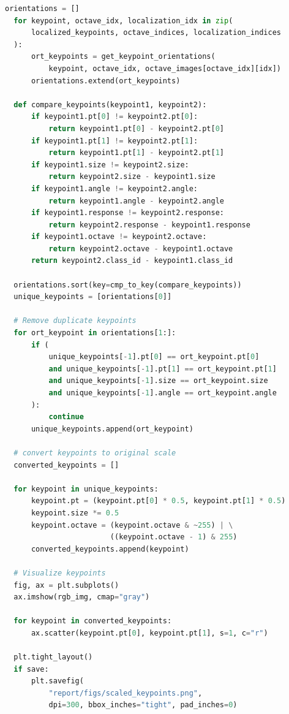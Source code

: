 \documentclass[11pt,a4paper]{article}
\begin{document}
\begin{lstlisting}[language=Python, caption=Orientation assignment]
  orientations = []
  for keypoint, octave_idx, localization_idx in zip(
      localized_keypoints, octave_indices, localization_indices
  ):
      ort_keypoints = get_keypoint_orientations(
          keypoint, octave_idx, octave_images[octave_idx][idx])
      orientations.extend(ort_keypoints)

  def compare_keypoints(keypoint1, keypoint2):
      if keypoint1.pt[0] != keypoint2.pt[0]:
          return keypoint1.pt[0] - keypoint2.pt[0]
      if keypoint1.pt[1] != keypoint2.pt[1]:
          return keypoint1.pt[1] - keypoint2.pt[1]
      if keypoint1.size != keypoint2.size:
          return keypoint2.size - keypoint1.size
      if keypoint1.angle != keypoint2.angle:
          return keypoint1.angle - keypoint2.angle
      if keypoint1.response != keypoint2.response:
          return keypoint2.response - keypoint1.response
      if keypoint1.octave != keypoint2.octave:
          return keypoint2.octave - keypoint1.octave
      return keypoint2.class_id - keypoint1.class_id

  orientations.sort(key=cmp_to_key(compare_keypoints))
  unique_keypoints = [orientations[0]]

  # Remove duplicate keypoints
  for ort_keypoint in orientations[1:]:
      if (
          unique_keypoints[-1].pt[0] == ort_keypoint.pt[0]
          and unique_keypoints[-1].pt[1] == ort_keypoint.pt[1]
          and unique_keypoints[-1].size == ort_keypoint.size
          and unique_keypoints[-1].angle == ort_keypoint.angle
      ):
          continue
      unique_keypoints.append(ort_keypoint)

  # convert keypoints to original scale
  converted_keypoints = []

  for keypoint in unique_keypoints:
      keypoint.pt = (keypoint.pt[0] * 0.5, keypoint.pt[1] * 0.5)
      keypoint.size *= 0.5
      keypoint.octave = (keypoint.octave & ~255) | \
                        ((keypoint.octave - 1) & 255)
      converted_keypoints.append(keypoint)

  # Visualize keypoints
  fig, ax = plt.subplots()
  ax.imshow(rgb_img, cmap="gray")

  for keypoint in converted_keypoints:
      ax.scatter(keypoint.pt[0], keypoint.pt[1], s=1, c="r")
      
  plt.tight_layout()
  if save:
      plt.savefig(
          "report/figs/scaled_keypoints.png",
          dpi=300, bbox_inches="tight", pad_inches=0)
\end{lstlisting}
\end{document}
